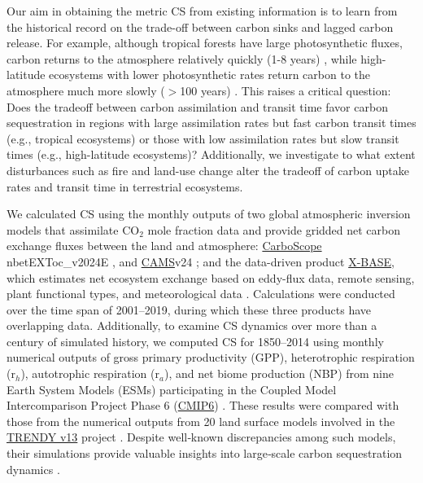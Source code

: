 \documentclass[ProofPDF]{./Styles/Jnls-Template-V3}
\begin{document}
Our aim in obtaining the metric CS from existing information is to learn from the historical record on the trade-off between carbon sinks and lagged carbon release. For example, although tropical forests have large photosynthetic fluxes, carbon returns to the atmosphere relatively quickly (1-8 years) \citep{Sierra2021JE,Chanca2025}, while high-latitude ecosystems with lower photosynthetic rates return carbon to the atmosphere much more slowly ($>$100 years) \citep{Carvalhais2014,Lu2018}. This raises a critical question: Does the tradeoff between carbon assimilation and transit time favor carbon sequestration in regions with large assimilation rates but fast carbon transit times (e.g., tropical ecosystems) or those with low assimilation rates but slow transit times (e.g., high-latitude ecosystems)? Additionally, we investigate to what extent disturbances such as fire and land-use change alter the tradeoff of carbon uptake rates and transit time in terrestrial ecosystems.

We calculated CS using the monthly outputs of two global atmospheric inversion models that assimilate CO$_2$ mole fraction data and provide gridded net carbon exchange fluxes between the land and atmosphere: \hyperlink{https://www.bgc-jena.mpg.de/CarboScope/}{CarboScope} nbetEXToc\_v2024E \citep{Rodenbeck2005}, and \hyperlink{https://ads.atmosphere.copernicus.eu/datasets/cams-global-greenhouse-gas-inversion?tab=overview}{CAMS}v24 \citep{Chevallier2013}; and the data-driven product \hyperlink{https://www.icos-cp.eu/data-products/fluxcom-x-global-fluxes-collection}{X-BASE}, which estimates net ecosystem \cite{Sierra2026CCCR} exchange based on eddy-flux data, remote sensing, plant functional types, and meteorological data \citep{Nelson2024}. Calculations were conducted over the time span of 2001–2019, during which these three products have overlapping data. Additionally, to examine CS dynamics over more than a century of simulated history, we computed CS for 1850–2014 using monthly numerical outputs of gross primary productivity (GPP), heterotrophic respiration (r$_h$), autotrophic respiration (r$_a$), and net biome production (NBP) from nine Earth System Models (ESMs) participating in the Coupled Model Intercomparison Project Phase 6 (\hyperlink{https://pcmdi.llnl.gov/CMIP6/}{CMIP6}) \citep{Eyring2016}. These results were compared with those from the numerical outputs from 20 land surface models involved in the \hyperlink{https://globalcarbonbudgetdata.org/}{TRENDY v13} project \citep{Sitch2024}. Despite well‑known discrepancies among such models, their simulations provide valuable insights into large‑scale carbon sequestration dynamics \citep{Gier2024,Sitch2024}.
  
\end{document}
